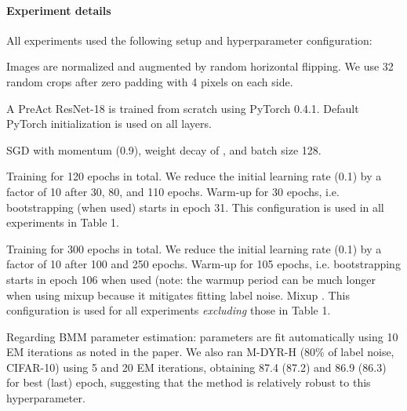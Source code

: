 \documentclass{article}
\begin{document}
\paragraph{Experiment details} All experiments used the following setup and hyperparameter configuration:
\begin{description}
\item[Preprocessing] Images are normalized and augmented by random horizontal flipping. We use 32 random crops after zero padding with 4 pixels on each side.
\item[Network] A PreAct ResNet-18 is trained from scratch using PyTorch 0.4.1. Default PyTorch initialization is used on all layers. 
\item[Optimizer] SGD with momentum (0.9), weight decay of , and batch size 128.
\item[Training schedule without mixup] Training for 120 epochs in total. We reduce the initial learning rate (0.1) by a factor of 10 after 30, 80, and
110 epochs. Warm-up for 30 epochs, i.e. bootstrapping (when used) starts
in epoch 31. This configuration is used in all experiments in Table
1.
\item[Training schedule with mixup] Training for 300 epochs in total.
We reduce the initial learning rate  (0.1) by a factor of 10 after 100 and 250
epochs. Warm-up for 105 epochs, i.e. bootstrapping starts
in epoch 106 when used (note: the warmup period can be much longer when using mixup because it mitigates fitting label noise. Mixup . This configuration is used for all experiments \textit{excluding}
those in Table 1.
\item 
\end{description}
Regarding BMM parameter estimation: parameters are fit automatically using 10 EM iterations as noted in the paper. 
We also ran M-DYR-H (80\% of label noise, CIFAR-10) using 5 and 20 EM iterations, obtaining 87.4 (87.2)
and 86.9 (86.3) for best (last) epoch, suggesting that the method is relatively robust to this hyperparameter.
\end{document}
